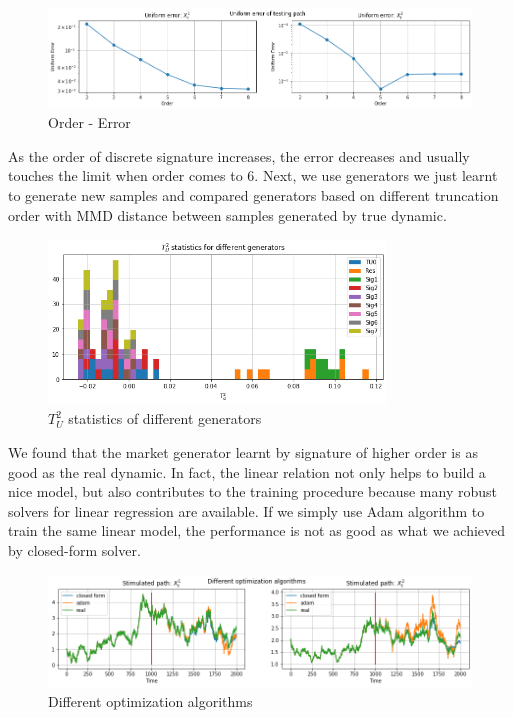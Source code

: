 \documentclass[12pt]{report}
\theoremstyle{definition}
\theoremstyle{remark}
\begin{document}
 \begin{figure}[H]
    \centering
    \includegraphics[width=\textwidth]{figs/res4.png}
    \caption{ Order - Error}
\end{figure}
As the order of discrete signature increases, the error decreases and usually touches the limit when order comes to 6. 
Next, we use generators we just learnt to generate new samples and compared generators based on different truncation order with MMD distance between samples generated by true dynamic. 
\begin{figure}[H]
  \centering
  \includegraphics[width=0.8\textwidth]{figs/res5.png}
  \caption{$T_{U}^{2}$ statistics of different generators}
\end{figure}
We found that the market generator learnt by signature of higher order is as good as the real dynamic. In fact, the linear relation not only helps to build a nice model, but also contributes to the training procedure because many robust solvers for linear regression are available. If we simply use Adam algorithm to train the same linear model, the performance is not as good as what we achieved by closed-form solver. 
\begin{figure}[H]
  \centering
  \includegraphics[width=\textwidth]{figs/res6.png}
  \caption{Different optimization algorithms}
\end{figure}
\end{document}
